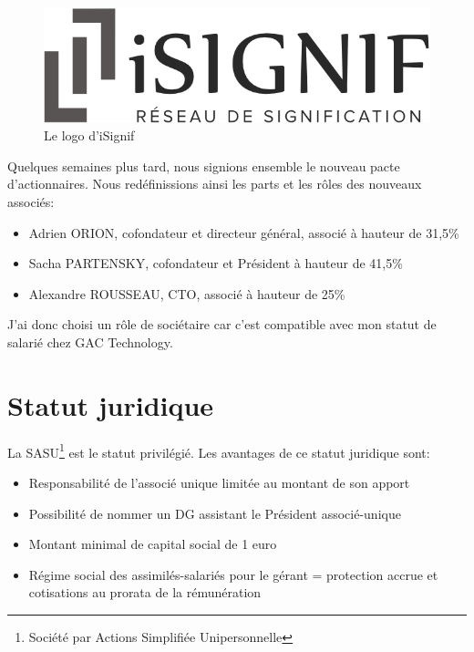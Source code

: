 \documentclass[]{report}
\begin{document}
    \begin{figure}[h!]
      \includegraphics[width=\linewidth]{img/logo.png}
      \caption{Le logo d'iSignif}
    \end{figure}

    Quelques semaines plus tard, nous signions ensemble le nouveau pacte d'actionnaires. Nous redéfinissions ainsi les parts et les rôles des nouveaux associés:

    \begin{itemize}
      \item Adrien ORION, cofondateur et directeur général, associé à hauteur de 31,5\%
      \item Sacha PARTENSKY, cofondateur et Président à hauteur de 41,5\%
      \item Alexandre ROUSSEAU, CTO, associé à hauteur de 25\%
    \end{itemize}

    J'ai donc choisi un rôle de sociétaire car c'est compatible avec mon statut de salarié chez GAC Technology.

  \section{Statut juridique}


    La SASU\footnote{Société par Actions Simplifiée Unipersonnelle} est le statut privilégié. Les avantages de ce statut juridique sont:

    \begin{itemize}
      \item Responsabilité de l'associé unique limitée au montant de son apport
      \item Possibilité de nommer un DG assistant le Président associé-unique
      \item Montant minimal de capital social de 1 euro
      \item Régime social des assimilés-salariés pour le gérant = protection accrue et cotisations au prorata de la rémunération
    \end{itemize}
\end{document}
